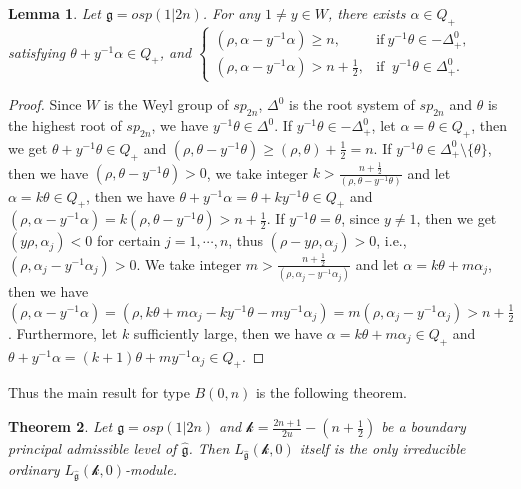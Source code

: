 \documentclass[12pt]{article}
\newtheorem{thm}{Theorem}[section]
\newtheorem{lem}[thm]{Lemma}
\begin{document}
\begin{lem}\label{lemy5}
Let $\mathfrak{g}=osp(1|2n)$.
For any $1\ne y\in W$, there exists $\alpha\in Q_+$ satisfying $\theta+y^{-1}\alpha\in Q_+$,
and $\begin{cases}
  (\rho,\alpha-y^{-1}\alpha)\geq n, & \text{if}~y^{-1}\theta\in -\Delta_+^0,\\
  (\rho,\alpha-y^{-1}\alpha)> n+\frac{1}{2},  & \text{if }~y^{-1}\theta\in \Delta_+^0.
\end{cases}$
\end{lem}
\begin{proof}
Since $W$ is the Weyl group of $sp_{2n}$, $\Delta^0$ is the root system of $sp_{2n}$ and $\theta$ is the highest root of $sp_{2n}$,
we have $y^{-1}\theta\in \Delta^0$.
If $y^{-1}\theta\in -\Delta_{+}^0$, let $\alpha=\theta\in Q_{+}$,
then we get $\theta+y^{-1}\theta\in Q_+$
and $(\rho,\theta-y^{-1}\theta)\geq(\rho,\theta)+\frac{1}{2}=n$.
If $y^{-1}\theta\in \Delta_+^0\setminus\{\theta\}$,
then we have $(\rho,\theta-y^{-1}\theta)>0$,
we take integer $k>\frac{n+\frac{1}{2}}{(\rho,\theta-y^{-1}\theta)}$ and let $\alpha=k\theta\in Q_+$,
then we have $\theta+y^{-1}\alpha=\theta+ky^{-1}\theta\in Q_+$ and
$(\rho,\alpha-y^{-1}\alpha)=k(\rho,\theta-y^{-1}\theta)> n+\frac{1}{2}$.
If $y^{-1}\theta=\theta$, since $y\ne1$, then we get $(y\rho, \alpha_j)<0$ for certain $j=1,\cdots,n$,
thus $(\rho-y\rho, \alpha_j)>0$, i.e., $(\rho,\alpha_j-y^{-1}\alpha_j)>0$.
We take integer $m>\frac{n+\frac{1}{2}}{(\rho,\alpha_j-y^{-1}\alpha_j)}$ and let $\alpha=k\theta+m\alpha_j$,
then we have $(\rho,\alpha-y^{-1}\alpha)=(\rho,k\theta+m\alpha_j-ky^{-1}\theta-my^{-1}\alpha_j)=m(\rho,\alpha_j-y^{-1}\alpha_j)> n+\frac{1}{2}$.
Furthermore, let $k$ sufficiently large, then we have $\alpha=k\theta+m\alpha_j\in Q_+$ and
$\theta+y^{-1}\alpha=(k+1)\theta+my^{-1}\alpha_j\in Q_+$.
\end{proof}
Thus the main result for type $B(0,n)$ is the following theorem.
\begin{thm}
Let $\mathfrak{g}=osp(1|2n)$ and
$\mathcal{k}=\frac{2n+1}{2u}-(n+\frac{1}{2})$ be a boundary principal admissible level of $\widehat{\mathfrak{g}}$.
Then $L_{\widehat{\mathfrak{g}}}(\mathcal{k},0)$ itself is the only irreducible ordinary $L_{\widehat{\mathfrak{g}}}(\mathcal{k},0)$-module.
\end{thm}
\end{document}
